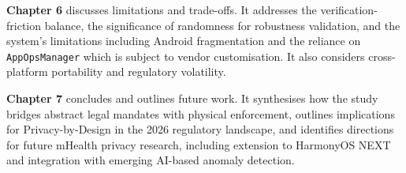 \textbf{Chapter 6} discusses limitations and trade-offs. It addresses the verification-friction balance, the significance of randomness for robustness validation, and the system's limitations including Android fragmentation and the reliance on \texttt{AppOpsManager} which is subject to vendor customisation. It also considers cross-platform portability and regulatory volatility.

\textbf{Chapter 7} concludes and outlines future work. It synthesises how the study bridges abstract legal mandates with physical enforcement, outlines implications for Privacy-by-Design in the 2026 regulatory landscape, and identifies directions for future mHealth privacy research, including extension to HarmonyOS NEXT and integration with emerging AI-based anomaly detection.
